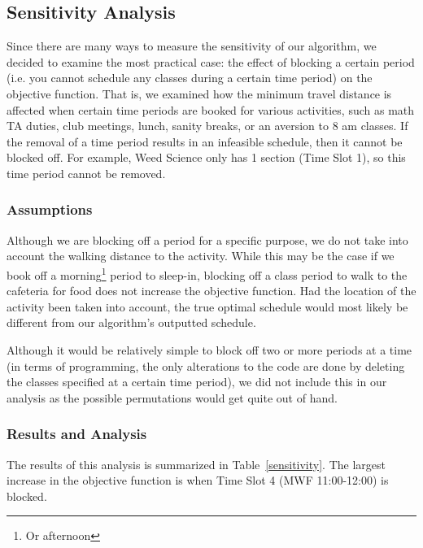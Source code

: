 \documentclass[11pt, oneside]{article}   	%
\begin{document}
\subsection{Sensitivity Analysis}

Since there are many ways to measure the sensitivity of our algorithm, we decided to examine the most practical case: the effect of blocking a certain period (i.e. you cannot schedule any classes during a certain time period) on the objective function. That is, we examined how the minimum travel distance is affected when certain time periods are booked for various activities, such as math TA duties, club meetings, lunch, sanity breaks, or an aversion to 8 am classes. If the removal of a time period results in an infeasible schedule, then it cannot be blocked off. For example, Weed Science only has 1 section (Time Slot 1), so this time period cannot be removed.

\subsubsection*{Assumptions}

Although we are blocking off a period for a specific purpose, we do not take into account the walking distance to the activity. While this may be the case if we book off a morning\footnote{Or afternoon} period to sleep-in, blocking off a class period to walk to the cafeteria for food does not increase the objective function. Had the location of the activity been taken into account, the true optimal schedule would most likely be different from our algorithm's outputted schedule. 

Although it would be relatively simple to block off two or more periods at a time (in terms of programming, the only alterations to the code are done by deleting the classes specified at a certain time period), we did not include this in our analysis as the possible permutations would get quite out of hand.

\subsubsection*{Results and Analysis}

The results of this analysis is summarized in Table~\ref{sensitivity}. The largest increase in the objective function is when Time Slot 4 (MWF 11:00-12:00) is blocked. 
\end{document}
